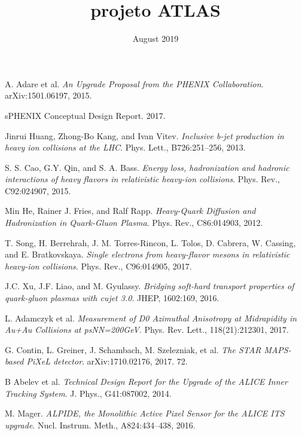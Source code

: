 \documentclass{report}
\title{projeto ATLAS}
\date{August 2019}
\begin{document}

%



\tableofcontents








\begin{thebibliography}{9}

A. Adare et al. \textit{An Upgrade Proposal from the PHENIX Collaboration}. arXiv:1501.06197, 2015.

 sPHENIX Conceptual Design Report. 2017.

 Jinrui Huang, Zhong-Bo Kang, and Ivan Vitev. \textit{Inclusive b-jet production in heavy ion collisions at the LHC}. Phys. Lett., B726:251–256, 2013.

 S. S. Cao, G.Y. Qin, and S. A. Bass. \textit{Energy loss, hadronization and hadronic interactions of heavy flavors in relativistic heavy-ion collisions}. Phys. Rev., C92:024907, 2015.

 Min He, Rainer J. Fries, and Ralf Rapp. \textit{Heavy-Quark Diffusion and Hadronization in Quark-Gluon Plasma}. Phys. Rev., C86:014903, 2012.

 T. Song, H. Berrehrah, J. M. Torres-Rincon, L. Tolos, D. Cabrera, W. Cassing, and E. Bratkovskaya. \textit{Single electrons from heavy-flavor mesons in relativistic heavy-ion collisions}. Phys. Rev., C96:014905, 2017.

 J.C. Xu, J.F. Liao, and M. Gyulassy. \textit{Bridging soft-hard transport properties of quark-gluon plasmas with cujet 3.0}. JHEP, 1602:169, 2016.

  L. Adamczyk et al. \textit{Measurement of D0 Azimuthal Anisotropy at Midrapidity in Au+Au Collisions at psNN=200GeV}. Phys. Rev. Lett., 118(21):212301, 2017.

 G. Contin, L. Greiner, J. Schambach, M. Szelezniak, et al. \textit{The STAR MAPS-based PiXeL detector}. arXiv:1710.02176, 2017. 72.

 B Abelev et al. \textit{Technical Design Report for the Upgrade of the ALICE Inner Tracking System}. J. Phys., G41:087002, 2014.

 M. Mager. \textit{ALPIDE, the Monolithic Active Pixel Sensor for the ALICE ITS upgrade}. Nucl. Instrum. Meth., A824:434–438, 2016.


\end{thebibliography}
\end{document}
